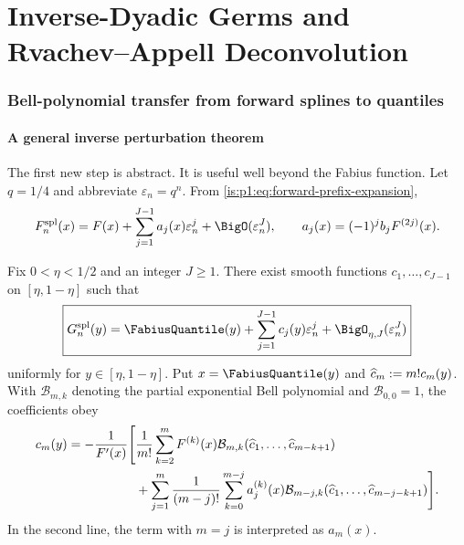 
\part{Inverse-Dyadic Germs and Rvachev--Appell Deconvolution}


\section{Bell-polynomial transfer from forward splines to quantiles}
\label{is:p1:sec:inverse-transfer}

\subsection{A general inverse perturbation theorem}

The first new step is abstract.  It is useful well beyond the Fabius function.
Let $q=1/4$ and abbreviate $\varepsilon_n=q^n$.  From \eqref{is:p1:eq:forward-prefix-expansion},
\begin{equation}
 \Fn(x)=F(x)+\sum_{j=1}^{J-1}a_j(x)\varepsilon_n^j+\BigO(\varepsilon_n^J),
 \qquad
 a_j(x)=(-1)^jb_jF^{(2j)}(x).
 \label{is:p1:eq:an-def}
\end{equation}

\begin{theorem}
\label{is:p1:thm:inverse-transfer}
Fix $0<\eta<1/2$ and an integer $J\ge1$.  There exist smooth functions
$c_1,\ldots,c_{J-1}$ on $[\eta,1-\eta]$ such that
\begin{equation}
 \boxed{
 \Gn(y)=\FabiusQuantile(y)+\sum_{j=1}^{J-1}c_j(y)\varepsilon_n^j
 +\BigO_{\eta,J}(\varepsilon_n^J)}
 \label{is:p1:eq:Gn-expansion}
\end{equation}
uniformly for $y\in[\eta,1-\eta]$.  Put $x=\FabiusQuantile(y)$ and
$\widehat{c}_{m}:=m!c_m(y)$.  With $\mathcal B_{m,k}$ denoting the partial exponential Bell
polynomial and $\mathcal B_{0,0}=1$, the coefficients obey
\begin{align}
 c_m(y)=-\frac1{F'(x)}\Bigg[&
 \frac1{m!}\sum_{k=2}^{m}F^{(k)}(x)
 \mathcal B_{m,k}(\widehat{c}_{1},\ldots,
 \widehat{c}_{m-k+1})
 \notag\\
 &+\sum_{j=1}^{m}\frac1{(m-j)!}
 \sum_{k=0}^{m-j}a_j^{(k)}(x)
 \mathcal B_{m-j,k}(\widehat{c}_{1},\ldots,
 \widehat{c}_{m-j-k+1})
 \Bigg].
 \label{is:p1:eq:Bell-inverse-recursion}
\end{align}
In the second line, the term with $m=j$ is interpreted as $a_m(x)$.
\end{theorem}

